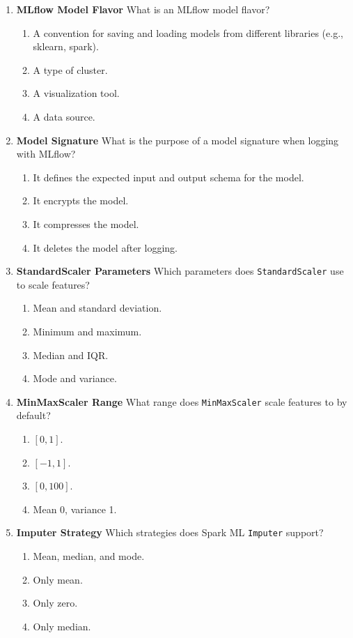 \documentclass{article}
\begin{document}
\begin{enumerate}[label=\textbf{Q\arabic*.}]
		\item \textbf{MLflow Model Flavor}
		What is an MLflow model flavor?
		\begin{enumerate}[label=\Alph*.]
			\item A convention for saving and loading models from different libraries (e.g., sklearn, spark).
			\item A type of cluster.
			\item A visualization tool.
			\item A data source.
		\end{enumerate}
		
		\item \textbf{Model Signature}
		What is the purpose of a model signature when logging with MLflow?
		\begin{enumerate}[label=\Alph*.]
			\item It defines the expected input and output schema for the model.
			\item It encrypts the model.
			\item It compresses the model.
			\item It deletes the model after logging.
		\end{enumerate}
		
		\item \textbf{StandardScaler Parameters}
		Which parameters does \texttt{StandardScaler} use to scale features?
		\begin{enumerate}[label=\Alph*.]
			\item Mean and standard deviation.
			\item Minimum and maximum.
			\item Median and IQR.
			\item Mode and variance.
		\end{enumerate}
		
		\item \textbf{MinMaxScaler Range}
		What range does \texttt{MinMaxScaler} scale features to by default?
		\begin{enumerate}[label=\Alph*.]
			\item $[0, 1]$.
			\item $[-1, 1]$.
			\item $[0, 100]$.
			\item Mean 0, variance 1.
		\end{enumerate}
		
		\item \textbf{Imputer Strategy}
		Which strategies does Spark ML \texttt{Imputer} support?
		\begin{enumerate}[label=\Alph*.]
			\item Mean, median, and mode.
			\item Only mean.
			\item Only zero.
			\item Only median.
		\end{enumerate}
		

\end{enumerate}
\end{document}

